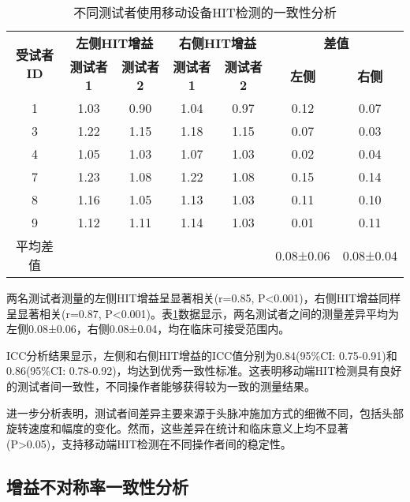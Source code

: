 \begin{table}[ht]
\centering
\caption{不同测试者使用移动设备HIT检测的一致性分析}
\label{tab:inter_tester_consistency}
\begin{tabular}{ccccccc}
\hline
\multirow{2}{*}{\textbf{受试者ID}} & \multicolumn{2}{c}{\textbf{左侧HIT增益}} & \multicolumn{2}{c}{\textbf{右侧HIT增益}} & \multicolumn{2}{c}{\textbf{差值}} \\
\cline{2-7}
 & \textbf{测试者1} & \textbf{测试者2} & \textbf{测试者1} & \textbf{测试者2} & \textbf{左侧} & \textbf{右侧} \\
\hline
1 & 1.03 & 0.90 & 1.04 & 0.97 & 0.12 & 0.07 \\
3 & 1.22 & 1.15 & 1.18 & 1.15 & 0.07 & 0.03 \\
4 & 1.05 & 1.03 & 1.07 & 1.03 & 0.02 & 0.04 \\
7 & 1.23 & 1.08 & 1.22 & 1.08 & 0.15 & 0.14 \\
8 & 1.16 & 1.05 & 1.13 & 1.03 & 0.11 & 0.10 \\
9 & 1.12 & 1.11 & 1.14 & 1.03 & 0.01 & 0.11 \\
\hline
平均差值 & \multicolumn{2}{c}{} & \multicolumn{2}{c}{} & 0.08±0.06 & 0.08±0.04 \\
\hline
\end{tabular}
\end{table}

两名测试者测量的左侧HIT增益呈显著相关(r=0.85, P<0.001)，右侧HIT增益同样呈显著相关(r=0.87, P<0.001)。表\ref{tab:inter_tester_consistency}数据显示，两名测试者之间的测量差异平均为左侧0.08±0.06，右侧0.08±0.04，均在临床可接受范围内。

ICC分析结果显示，左侧和右侧HIT增益的ICC值分别为0.84(95\%CI: 0.75-0.91)和0.86(95\%CI: 0.78-0.92)，均达到优秀一致性标准。这表明移动端HIT检测具有良好的测试者间一致性，不同操作者能够获得较为一致的测量结果。

进一步分析表明，测试者间差异主要来源于头脉冲施加方式的细微不同，包括头部旋转速度和幅度的变化。然而，这些差异在统计和临床意义上均不显著(P>0.05)，支持移动端HIT检测在不同操作者间的稳定性。

\subsection{增益不对称率一致性分析}


